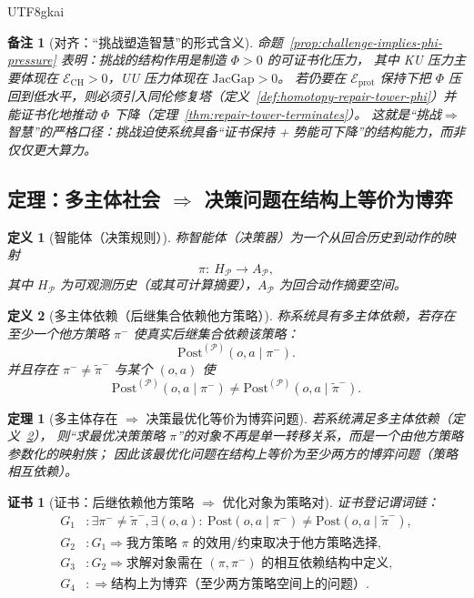 \documentclass[12pt]{article}
\newtheorem{definition}{定义}[section]
\newtheorem{theorem}{定理}[section]
\newtheorem{remark}{备注}[section]
\newtheorem{Certificate}{证书}[section]
\newcommand{\JacGap}{\ensuremath{\mathrm{JacGap}}} %
\begin{document}
\begin{CJK*}{UTF8}{gkai}
\begin{remark}[对齐：“挑战塑造智慧”的形式含义]
命题~\ref{prop:challenge-implies-phi-pressure} 表明：挑战的结构作用是制造 $\Phi>0$ 的可证书化压力，
其中 KU 压力主要体现在 $\mathcal{E}_{\mathrm{CH}}>0$，UU 压力体现在 $\JacGap>0$。
若仍要在 $\mathcal{E}_{\mathrm{prot}}$ 保持下把 $\Phi$ 压回到低水平，则必须引入同伦修复塔（定义~\ref{def:homotopy-repair-tower-phi}）并能证书化地推动 $\Phi$
  下降（定理~\ref{thm:repair-tower-terminates}）。
这就是“挑战$\Rightarrow$智慧”的严格口径：挑战迫使系统具备“证书保持 + 势能可下降”的结构能力，而非仅仅更大算力。
\end{remark}

\subsection{定理：多主体社会 $\Rightarrow$ 决策问题在结构上等价为博弈}
\label{sec:multiagent-implies-game}

\begin{definition}[智能体（决策规则）]
\label{def:agent-policy-decision}
称智能体（决策器）为一个从回合历史到动作的映射
\[
  \pi:\ H_{\mathcal{P}}\to A_{\mathcal{P}},
\]
其中 $H_{\mathcal{P}}$ 为可观测历史（或其可计算摘要），$A_{\mathcal{P}}$ 为回合动作摘要空间。
\end{definition}

\begin{definition}[多主体依赖（后继集合依赖他方策略）]
\label{def:multiagent-dependence}
称系统具有多主体依赖，若存在至少一个他方策略 $\pi^{-}$ 使真实后继集合依赖该策略：
\[
  \mathrm{Post}^{(\mathcal{P})}(o,a\mid \pi^{-}).
\]
并且存在 $\pi^{-}\neq \tilde\pi^{-}$ 与某个 $(o,a)$ 使
\[
  \mathrm{Post}^{(\mathcal{P})}(o,a\mid \pi^{-})\neq \mathrm{Post}^{(\mathcal{P})}(o,a\mid \tilde\pi^{-}).
\]
\end{definition}

\begin{theorem}[多主体存在 $\Rightarrow$ 决策最优化等价为博弈问题]
\label{thm:multiagent-implies-game}
若系统满足多主体依赖（定义~\ref{def:multiagent-dependence}），
则“求最优决策策略 $\pi$”的对象不再是单一转移关系，而是一个由他方策略参数化的映射族；
因此该最优化问题在结构上等价为至少两方的博弈问题（策略相互依赖）。
\end{theorem}

\begin{Certificate}[证书：后继依赖他方策略 $\Rightarrow$ 优化对象为策略对]
\label{cert:multiagent-implies-game}
证书登记谓词链：
\[
\begin{aligned}
  G_1 &: \exists \pi^{-}\neq\tilde\pi^{-},\exists(o,a):\ \mathrm{Post}(o,a\mid \pi^{-})\neq \mathrm{Post}(o,a\mid
    \tilde\pi^{-}),\\
  G_2 &: G_1\Rightarrow \text{我方策略 $\pi$ 的效用/约束取决于他方策略选择},\\
  G_3 &: G_2\Rightarrow \text{求解对象需在 $(\pi,\pi^{-})$ 的相互依赖结构中定义},\\
  G_4 &: \Rightarrow \text{结构上为博弈（至少两方策略空间上的问题）}.
\end{aligned}
\]
\end{Certificate}


\end{CJK*}
\end{document}
